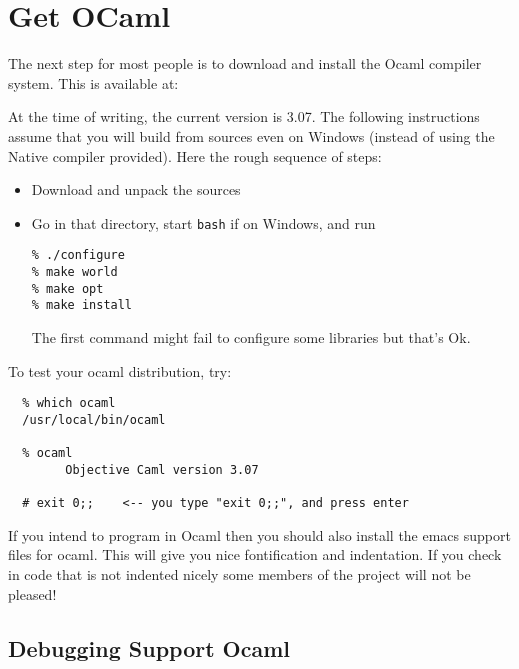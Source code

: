 \documentclass{article}
\def\t#1{{\tt #1}}
\begin{document}
\section{Get OCaml}\label{sec-ocaml}

The next step for most people is to download and install the Ocaml
compiler system.  This is available at:


At the time of writing, the current version is 3.07. The following
instructions assume that you will build from sources even on Windows (instead
of using the Native compiler provided). Here the rough sequence of steps:
\begin{itemize}
\item Download and unpack the sources
\item Go in that directory, start \t{bash} if on Windows, and run
\begin{verbatim}
% ./configure
% make world
% make opt
% make install
\end{verbatim}

 The first command might fail to configure some libraries but that's Ok. 
\end{itemize}

To test your ocaml distribution, try:

\begin{verbatim}
  % which ocaml
  /usr/local/bin/ocaml

  % ocaml
        Objective Caml version 3.07

  # exit 0;;    <-- you type "exit 0;;", and press enter
\end{verbatim}

 If you intend to program in Ocaml then you should also install the emacs
support files for ocaml. This will give you nice fontification and
indentation. If you check in code that is not indented nicely some members of
the project will not be pleased!

 \subsection{Debugging Support Ocaml}
\end{document}
